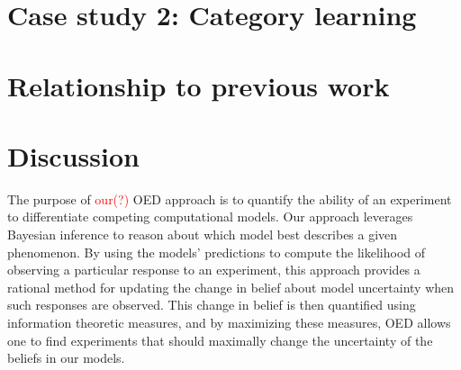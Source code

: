 \documentclass{article}
\newcommand{\red}[1]{\textcolor{Red}{#1}}
\begin{document}
\section{Case study 2: Category learning}
\section{Relationship to previous work}
\section{Discussion}

The purpose of \red{our(?)} OED approach is to quantify the ability of an experiment to differentiate competing computational models. Our approach leverages Bayesian inference to reason about which model best describes a given phenomenon. By using the models' predictions to compute the likelihood of observing a particular response to an experiment, this approach provides a rational method for updating the change in belief about model uncertainty when such responses are observed. This change in belief is then quantified using information theoretic measures, and by maximizing these measures, OED allows one to find experiments that should maximally change the uncertainty of the beliefs in our models. 
\end{document}
